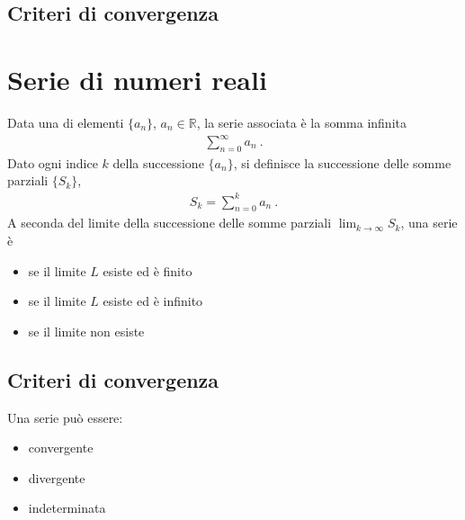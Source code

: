 \documentclass[letterpaper,10pt,italian]{jupyterBook}
\begin{document}
\subsection{Criteri di convergenza}
\label{\detokenize{ch/series:criteri-di-convergenza}}
\sphinxAtStartPar
{}


\section{Serie di numeri reali}
\label{\detokenize{ch/series:serie-di-numeri-reali}}\label{\detokenize{ch/series:math-hs-series-real-series}}
\sphinxAtStartPar
{} Data una  di elementi \(\{ a_n \}\), \(a_n \in \mathbb{R}\), la serie associata è la somma infinita
\begin{equation*}
\begin{split}\sum_{n=0}^{\infty} a_n \ .\end{split}
\end{equation*}
\sphinxAtStartPar
Dato ogni indice \(k\) della successione \(\{ a_n \}\), si definisce la successione delle somme parziali \(\{ S_k \}\),
\begin{equation*}
\begin{split}S_k = \sum_{n=0}^{k} a_n \ .\end{split}
\end{equation*}
\sphinxAtStartPar
{}
A seconda del limite della successione delle somme parziali \(\lim_{k \rightarrow \infty} S_k\), una serie è
\begin{itemize}
\item {} 
\sphinxAtStartPar
{} se il limite \(L\) esiste ed è finito

\item {} 
\sphinxAtStartPar
{} se il limite \(L\) esiste ed è infinito

\item {} 
\sphinxAtStartPar
{} se il limite non esiste

\end{itemize}


\subsection{Criteri di convergenza}
\label{\detokenize{ch/series:id1}}
\sphinxAtStartPar
Una serie può essere:
\begin{itemize}
\item {} 
\sphinxAtStartPar
convergente

\item {} 
\sphinxAtStartPar
divergente

\item {} 
\sphinxAtStartPar
indeterminata

\end{itemize}
\end{document}
